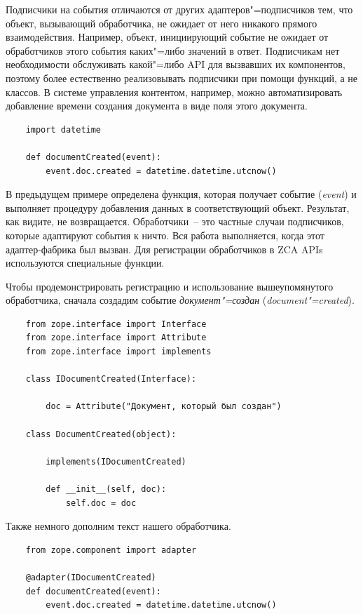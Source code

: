 \documentclass[a4paper,openany,twoside,final]{book}
\providecommand*{\DUroletitlereference}[1]{\textsl{#1}}
\begin{document}
Подписчики на события отличаются от других адаптеров"=подписчиков тем, что объект, вызывающий обработчика, не ожидает от него никакого прямого взаимодействия.  Например, объект, инициирующий событие не ожидает от обработчиков этого события каких"=либо значений в ответ.  Подписчикам нет необходимости обслуживать какой"=либо API для вызвавших их компонентов, поэтому более естественно реализовывать подписчики при помощи функций, а не классов.  В системе управления контентом, например, можно автоматизировать добавление времени создания документа в виде поля этого документа.

\begin{verbatim}
    import datetime

    def documentCreated(event):
        event.doc.created = datetime.datetime.utcnow()
\end{verbatim}

В предыдущем примере определена функция, которая получает событие (\DUroletitlereference{event}) и выполняет процедуру добавления данных в соответствующий объект.  Результат, как видите, не возвращается.  Обработчики~-- это частные случаи подписчиков, которые адаптируют события к \textquotedbl{}ничто\textquotedbl{}.  Вся работа выполняется, когда этот адаптер-\textquotedbl{}фабрика\textquotedbl{} был вызван.  Для регистрации обработчиков в ZCA APIs используются специальные функции.

Чтобы продемонстрировать регистрацию и использование вышеупомянутого обработчика, сначала создадим событие \DUroletitlereference{документ"=создан} (\DUroletitlereference{document"=created}).

\begin{verbatim}
    from zope.interface import Interface
    from zope.interface import Attribute
    from zope.interface import implements

    class IDocumentCreated(Interface):

        doc = Attribute("Документ, который был создан")

    class DocumentCreated(object):

        implements(IDocumentCreated)

        def __init__(self, doc):
            self.doc = doc
\end{verbatim}

Также немного дополним текст нашего обработчика.

\begin{verbatim}
    from zope.component import adapter

    @adapter(IDocumentCreated)
    def documentCreated(event):
        event.doc.created = datetime.datetime.utcnow()
\end{verbatim}
\end{document}
